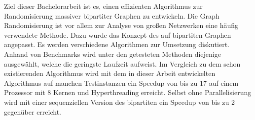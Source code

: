 Ziel dieser Bachelorarbeit ist es, einen effizienten Algorithmus
zur Randomisierung massiver bipartiter Graphen zu entwickeln.
Die Graph Randomisierung ist vor allem zur Analyse von großen Netzwerken eine häufig verwendete Methode.
 Dazu 
wurde das Konzept des \gc{} auf bipartiten Graphen
angepasst. Es werden verschiedene Algorithmen zur Umsetzung diskutiert.
Anhand von Benchmarks wird unter den getesteten Methoden diejenige ausgewählt,
welche die geringste Laufzeit aufweist.
Im Vergleich zu dem schon existierenden \cb{} Algorithmus 
wird mit dem in dieser Arbeit entwickelten Algorithmus 
auf manchen Testinstanzen ein Speedup von bis zu 17 auf einem Prozessor mit 8 Kernen und Hyperthreading 
erreicht. Selbst ohne Parallelisierung wird mit einer sequenziellen Version des bipartiten \gc{} ein Speedup
von bis zu 2 gegenüber \cb{} erreicht.

